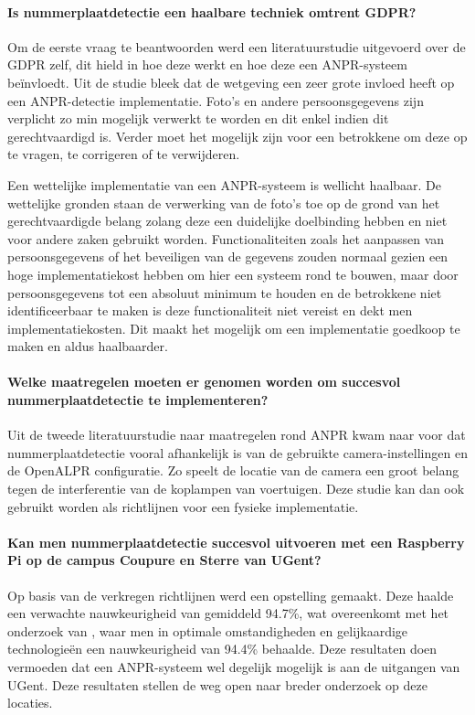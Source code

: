 \documentclass[a0,portrait]{a0poster}
\begin{document}
\begin{multicols}{2}
\paragraph{Is nummerplaatdetectie een haalbare techniek omtrent GDPR?}
Om de eerste vraag te beantwoorden werd een literatuurstudie uitgevoerd over de GDPR zelf, dit hield in hoe deze werkt en hoe deze een ANPR-systeem beïnvloedt. Uit de studie bleek dat de wetgeving een zeer grote invloed heeft op een ANPR-detectie implementatie. Foto's en andere persoonsgegevens zijn verplicht zo min mogelijk verwerkt te worden en dit enkel indien dit gerechtvaardigd is. Verder moet het mogelijk zijn voor een betrokkene om deze op te vragen, te corrigeren of te verwijderen.

Een wettelijke implementatie van een ANPR-systeem is wellicht haalbaar. De wettelijke gronden staan de verwerking van de foto's toe op de grond van het gerechtvaardigde belang zolang deze een duidelijke doelbinding hebben en niet voor andere zaken gebruikt worden. Functionaliteiten zoals het aanpassen van persoonsgegevens of het beveiligen van de gegevens zouden normaal gezien een hoge implementatiekost hebben om hier een systeem rond te bouwen, maar door persoonsgegevens tot een absoluut minimum te houden en de betrokkene niet identificeerbaar te maken is deze functionaliteit niet vereist en dekt men implementatiekosten. Dit maakt het mogelijk om een implementatie goedkoop te maken en aldus haalbaarder.

\paragraph{Welke maatregelen moeten er genomen worden om succesvol nummerplaatdetectie te implementeren?}
Uit de tweede literatuurstudie naar maatregelen rond ANPR kwam naar voor dat nummerplaatdetectie vooral afhankelijk is van de gebruikte camera-instellingen en de OpenALPR configuratie. Zo speelt de locatie van de camera een groot belang tegen de interferentie van de koplampen van voertuigen. Deze studie kan dan ook gebruikt worden als richtlijnen voor een fysieke implementatie.

\paragraph{Kan men nummerplaatdetectie succesvol uitvoeren met een Raspberry Pi op de campus Coupure en Sterre van UGent?}
Op basis van de verkregen richtlijnen werd een opstelling gemaakt. Deze haalde een verwachte nauwkeurigheid van gemiddeld 94.7\%, wat overeenkomt met het onderzoek van , waar men in optimale omstandigheden en gelijkaardige technologieën een nauwkeurigheid van 94.4\% behaalde. Deze resultaten doen vermoeden dat een ANPR-systeem wel degelijk mogelijk is aan de uitgangen van UGent. Deze resultaten stellen de weg open naar breder onderzoek op deze locaties.


\end{multicols}
\end{document}
